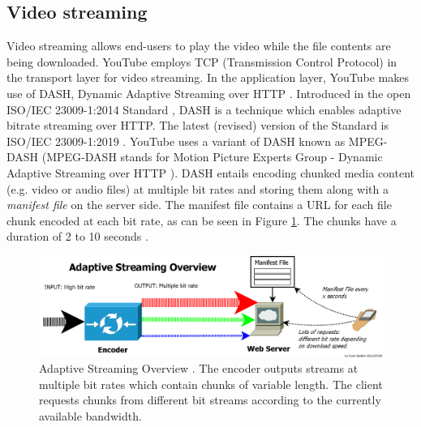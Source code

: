 \subsection{Video streaming} \label{subsec:background:video}
Video streaming allows end-users to play the video while the file contents are being downloaded. YouTube employs \gls{TCP} (Transmission Control Protocol) in the transport layer for video streaming. \cite{rao2011network} In the application layer, YouTube makes use of \gls{DASH}, Dynamic Adaptive Streaming over \gls{HTTP} \cite{ytdash}. Introduced in the open \gls{ISO}/\gls{IEC} 23009-1:2014 Standard \cite{iso2014}, \gls{DASH} is a technique which enables adaptive bitrate streaming over \gls{HTTP}. The latest (revised) version of the Standard is \gls{ISO}/\gls{IEC} 23009-1:2019 \cite{iso2019}. YouTube uses a variant of \gls{DASH} known as \gls{MPEG}-\gls{DASH} \cite{ytdash} (\gls{MPEG}-\gls{DASH} stands for Motion Picture Experts Group - Dynamic Adaptive Streaming over \gls{HTTP} \cite{mpeg}). \gls{DASH} entails encoding chunked media content (e.g. video or audio files) at multiple bit rates and storing them along with a \textit{manifest file} on the server side. The manifest file contains a \gls{URL} for each file chunk encoded at each bit rate, as can be seen in Figure \ref{fig:intro:dash}. The chunks have a duration of 2 to 10 seconds \cite{lederer}.

\begin{figure}[H]
	\centering
	\includegraphics[scale=0.2]{Figures/Adaptivestreami.png}
	\caption[Adaptive Streaming Overview]{Adaptive Streaming Overview \cite{dashimg}. The encoder outputs streams at multiple bit rates which contain chunks of variable length. The client requests chunks from different bit streams according to the currently available bandwidth.}
	\label{fig:intro:dash}
\end{figure}

